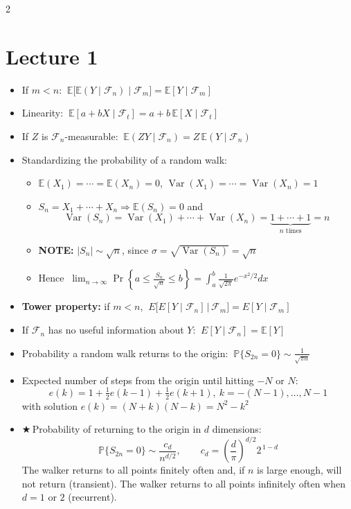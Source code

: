 \documentclass[8pt,letterpaper]{extarticle}
\newcommand{\cs}{{\color{red!75!black}$\bigstar$}\,} %
\begin{document}
\begin{multicols}{2}

\section{Lecture 1}
\begin{itemize}
  \item If $m<n$: $\ \mathbb{E}\big[\mathbb{E}(Y\mid\mathcal{F}_n)\mid\mathcal{F}_m\big]=\mathbb{E}[Y\mid\mathcal{F}_m]$
  \item Linearity: $\ \mathbb{E}[a+bX\mid\mathcal{F}_t]=a+b\,\mathbb{E}[X\mid\mathcal{F}_t]$
  \item If $Z$ is $\mathcal{F}_n$-measurable: $\ \mathbb{E}(ZY\mid\mathcal{F}_n)=Z\,\mathbb{E}(Y\mid\mathcal{F}_n)$
  \item Standardizing the probability of a random walk:
    \begin{itemize}
      \item $\mathbb{E}(X_1)=\cdots=\mathbb{E}(X_n)=0$, $\operatorname{Var}(X_1)=\cdots=\operatorname{Var}(X_n)=1$
      \item $S_n=X_1+\cdots+X_n \Rightarrow \mathbb{E}(S_n)=0$ and
        \[ \operatorname{Var}(S_n)=\operatorname{Var}(X_1)+\cdots+\operatorname{Var}(X_n)=\underbrace{1+\cdots+1}_{n\text{ times}}=n \]
      \item \textbf{NOTE:} $|S_n|\sim\sqrt{n}$, since $\sigma=\sqrt{\operatorname{Var}(S_n)}=\sqrt{n}$
      \item Hence $\ \lim_{n\to\infty}\Pr\left\{a\le \frac{S_n}{\sqrt{n}}\le b\right\}=\int_a^b \frac{1}{\sqrt{2\pi}}e^{-x^2/2}dx$
    \end{itemize}
  \item \textbf{Tower property:} if $m<n$, $\ E\big[E[Y\mid\mathcal{F}_n]\,\big|\,\mathcal{F}_m\big]=E[Y\mid\mathcal{F}_m]$
  \item If $\mathcal{F}_n$ has no useful information about $Y$: $\ E[Y\mid\mathcal{F}_n]=\mathbb{E}[Y]$
  \item Probability a random walk returns to the origin: $\ \mathbb{P}\{S_{2n}=0\}\sim\frac{1}{\sqrt{\pi n}}$
  \item Expected number of steps from the origin until hitting $-N$ or $N$:
    \[ e(k)=1+\tfrac12 e(k-1)+\tfrac12 e(k+1),\ k=-(N-1),\dots,N-1 \]
    with solution $e(k)=(N+k)(N-k)=N^2-k^2$
  \item \cs Probability of returning to the origin in $d$ dimensions:
    \[ \mathbb{P}\{S_{2n}=0\}\sim\frac{c_d}{n^{d/2}},\qquad c_d=\left(\frac{d}{\pi}\right)^{d/2}2^{\,1-d} \]
    The walker returns to all points finitely often and, if $n$ is large enough, will not return (transient). The walker returns to all points infinitely often when $d=1$ or $2$ (recurrent).
\end{itemize}


\end{multicols}
\end{document}

